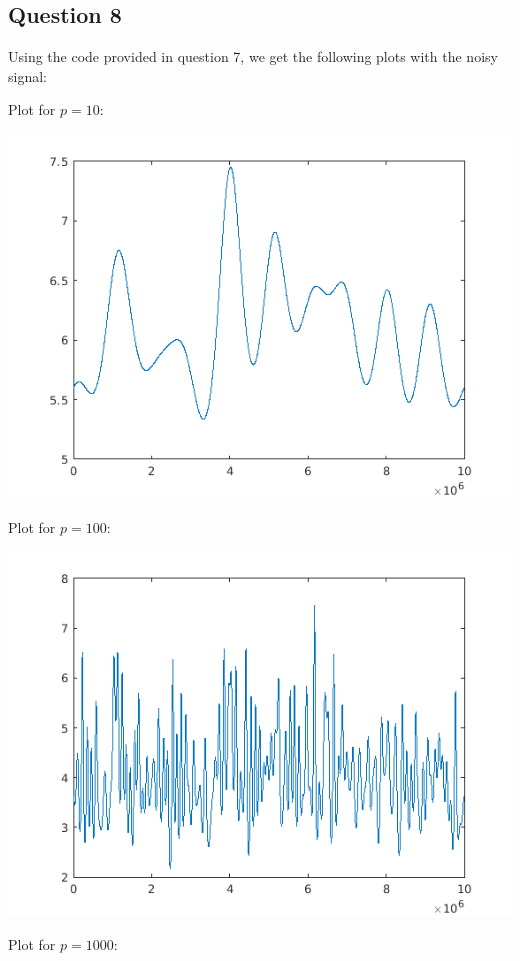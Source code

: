 \documentclass[conference,9pt]{IEEEtran}
\begin{document}
\subsection{Question 8}

Using the code provided in question 7, we get the following plots with the noisy signal:

Plot for $p=10$:

\includegraphics[scale=0.6]{pn10}

Plot for $p=100$:

\includegraphics[scale=0.6]{pn100}

Plot for $p=1000$:
\end{document}
